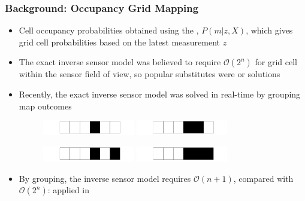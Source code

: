 \documentclass[11pt,professionalfonts,hyperref={pdftex,pdfpagemode=none,pdfstartview=FitH}]{beamer}
\renewcommand{\emph}[1]{\textit{\textbf{\color{blue}{#1}}}}
\begin{document}
\begin{frame}
\frametitle{Background: Occupancy Grid Mapping}
	\begin{itemize}
		\item Cell occupancy probabilities obtained using the \emph{inverse sensor model}, $P(m|z,X)$, which gives grid cell probabilities based on the latest measurement $z$
		\item The exact inverse sensor model was believed to require $\mathcal O(2^n)$ for \emph{each} grid cell within the sensor field of view, so popular substitutes were \emph{heuristic} or \emph{learned} solutions
		\item Recently, the exact inverse sensor model was solved in real-time by grouping map outcomes
		\begin{figure}[!htbp]
		\vspace*{0.5cm}
		\centerline{
			\includegraphics[width=4.0cm]{rkplus_1.png}\hspace*{-0.5cm}
			\includegraphics[width=4.0cm]{rkplus_2.png}}
		 \centerline{
		\includegraphics[width=4.0cm]{rkplus_3.png}\hspace*{-0.5cm}
		\includegraphics[width=4.0cm]{rkplus_4.png}}
		\end{figure}
		\item By grouping, the inverse sensor model requires $\mathcal O(n+1)$, compared with $\mathcal O(2^n)$: applied in \emph{real-time}
	\end{itemize}
\end{frame}


\end{document}
